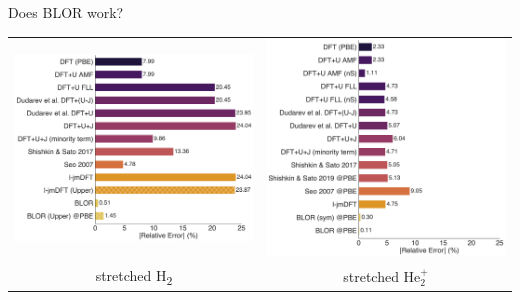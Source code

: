\documentclass[xcolor=table,aspectratio=169]{beamer}
\numberwithin{equation}{section}
\begin{document}
\begin{frame}{Does BLOR work?}
    \begin{tabularx}{0.9\textwidth}{CC}
        \includegraphics[height=0.6\textheight]{figures/burgess/h2_extended.pdf} &
        \includegraphics[height=0.6\textheight]{figures/burgess/He2+.pdf}          \\
        stretched H\textsubscript{2}                                             &
        stretched He$_2^+$                                                         \\
    \end{tabularx}
\end{frame}
\end{document}

